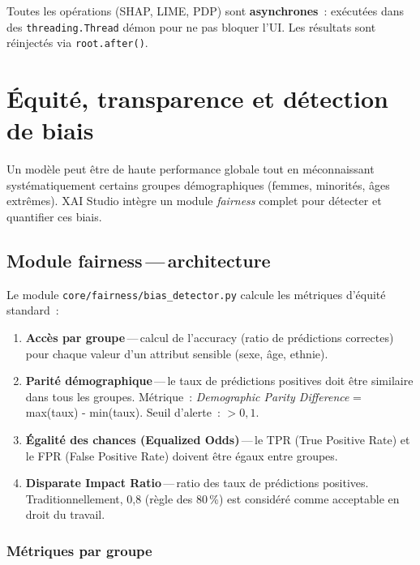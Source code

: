 \documentclass[11pt,a4paper]{report}
\begin{document}
Toutes les op\'erations (SHAP, LIME, PDP) sont \textbf{asynchrones}~:
ex\'ecut\'ees dans des \texttt{threading.Thread} d\'emon pour ne pas
bloquer l'UI. Les r\'esultats sont r\'einject\'es via \texttt{root.after()}.

\chapter{\'Equit\'e, transparence et d\'etection de biais}

Un mod\`ele peut \^etre de haute performance globale tout en
m\'econnaissant syst\'ematiquement certains groupes d\'emographiques
(femmes, minorit\'es, \^ages extr\^emes). XAI Studio int\`egre un module
\textit{fairness} complet pour d\'etecter et quantifier ces biais.

\section{Module fairness\,---\,architecture}

Le module \texttt{core/fairness/bias\_detector.py} calcule les
m\'etriques d'\'equit\'e standard~:

\begin{enumerate}
    \item \textbf{Acc\`es par groupe}\,---\,calcul de l'accuracy
        (ratio de pr\'edictions correctes) pour chaque valeur d'un
        attribut sensible (sexe, \^age, ethnie).
    \item \textbf{Parit\'e d\'emographique}\,---\,le taux de pr\'edictions
        positives doit \^etre similaire dans tous les groupes.
        M\'etrique~: \textit{Demographic Parity Difference} = max(taux) - min(taux).
        Seuil d'alerte~: $> 0{,}1$.
    \item \textbf{\'Egalit\'e des chances (Equalized Odds)}\,---\,le
        TPR (True Positive Rate) et le FPR (False Positive Rate)
        doivent \^etre \'egaux entre groupes.
    \item \textbf{Disparate Impact Ratio}\,---\,ratio des taux de
        pr\'edictions positives. Traditionnellement, 0,8 (r\`egle des 80\,\%)
        est consid\'er\'e comme acceptable en droit du travail.
\end{enumerate}

\subsection{M\'etriques par groupe}
\end{document}
